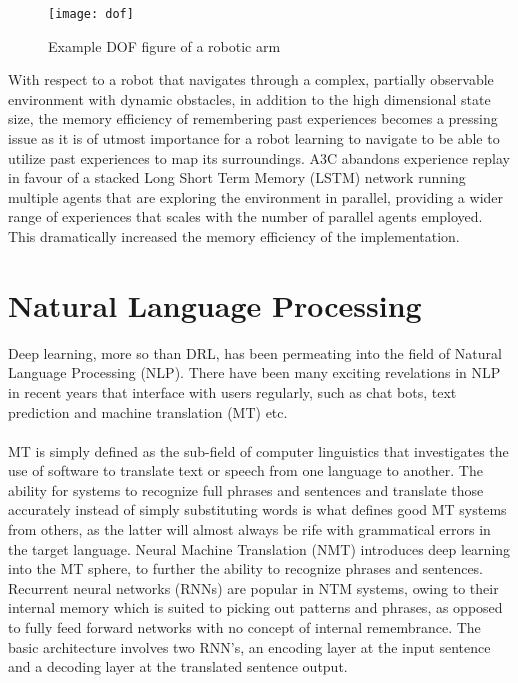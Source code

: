\begin{figure}[h]
    \centering
    \texttt{[image: dof]}
    \caption{Example DOF figure of a robotic arm}
\end{figure}

With respect to a robot that navigates through a complex, partially observable environment with dynamic obstacles, in addition to the high dimensional state size, the memory efficiency of remembering past experiences becomes a pressing issue as it is of utmost importance for a robot learning to navigate to be able to utilize past experiences to map its surroundings. A3C abandons experience replay in favour of a stacked Long Short Term Memory (LSTM) network running multiple agents that are exploring the environment in parallel, providing a wider range of experiences that scales with the number of parallel agents employed. This dramatically increased the memory efficiency of the implementation.

\section{Natural Language Processing}
Deep learning, more so than DRL, has been permeating into the field of Natural Language Processing (NLP). There have been many exciting revelations in NLP in recent years that interface with users regularly, such as chat bots, text prediction and machine translation (MT) etc. \paragraph{}

MT is simply defined as the sub-field of computer linguistics that investigates the use of software to translate text or speech from one language to another. The ability for systems to recognize full phrases and sentences and translate those accurately instead of simply substituting words is what defines good MT systems from others, as the latter will almost always be rife with grammatical errors in the target language. Neural Machine Translation (NMT) introduces deep learning into the MT sphere, to further the ability to recognize phrases and sentences. Recurrent neural networks (RNNs) are popular in NTM systems, owing to their internal memory which is suited to picking out patterns and phrases, as opposed to fully feed forward networks with no concept of internal remembrance. The basic architecture involves two RNN's, an encoding layer at the input sentence and a decoding layer at the translated sentence output. \paragraph{}

